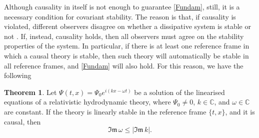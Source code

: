 \documentclass[a4paper, amsfonts, amssymb, amsmath, reprint, showkeys, nofootinbib, twoside,notitlepage]{revtex4-1}
\theoremstyle{definition}
\theoremstyle{theorem}
\newtheorem{theorem}{Theorem}
\theoremstyle{corollary}
\begin{document}
Although causality in itself is not enough to guarantee \eqref{Fundam}, still, it is a necessary condition for covariant stability. The reason is that, if causality is violated, different observers disagree on whether a dissipative system is stable or not \cite{GavassinoSuperluminal2021}. If, instead, causality holds, then all observers must agree on the stability properties of the system. In particular, if there is at least one reference frame in which a causal theory is stable, then such theory will automatically be stable in all reference frames, and \eqref{Fundam} will also hold. For this reason, we have the following
\begin{theorem}\label{Theocaus}
Let $\Psi(t,x) = \Psi_0 e^{i(kx-\omega t)}$ be a solution of the linearised equations of a relativistic hydrodynamic theory, where $\Psi_0 \neq 0$, $k \in \mathbb{C}$, and $\omega \in \mathbb{C}$ are constant. If the theory is linearly stable in the reference frame $\{t,x \}$, and it is causal, then
\begin{equation}
\mathfrak{Im}\, \omega \leq |\mathfrak{Im} \, k| .
\end{equation}
\end{theorem}
\end{document}
